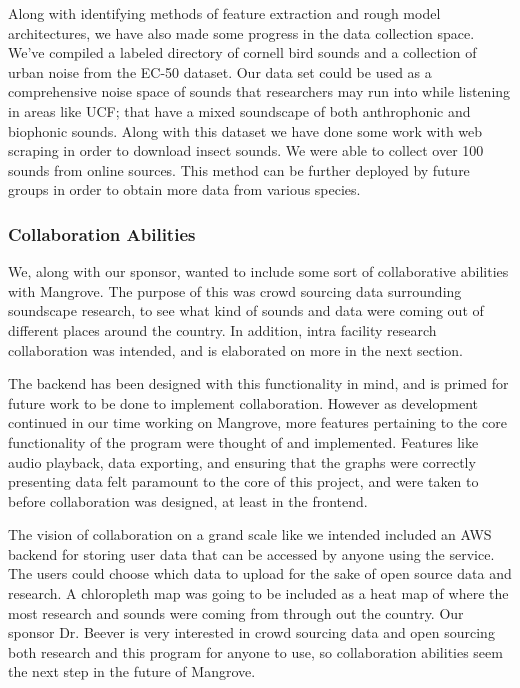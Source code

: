 Along with identifying methods of feature extraction and rough model architectures, we have also made some progress in the data collection space. We've compiled a labeled directory of cornell bird sounds and a collection of urban noise from the EC-50 dataset.\cite{soundData} Our data set could be used as a comprehensive noise space of sounds that researchers may run into while listening in areas like UCF; that have a mixed soundscape of both anthrophonic and biophonic sounds. Along with this dataset we have done some work with web scraping in order to download insect sounds. We were able to collect over 100 sounds from online sources.\cite{ot} This method can be further deployed by future groups in order to obtain more data from various species.

\subsubsection{Collaboration Abilities}
We, along with our sponsor, wanted to include some sort of collaborative abilities with Mangrove. The purpose of this was crowd sourcing data surrounding soundscape research, to see what kind of sounds and data were coming out of different places around the country. In addition, intra facility research collaboration was intended, and is elaborated on more in the next section.\par
The backend has been designed with this functionality in mind, and is primed for future work to be done to implement collaboration. However as development continued in our time working on Mangrove, more features pertaining to the core functionality of the program were thought of and implemented. Features like audio playback, data exporting, and ensuring that the graphs were correctly presenting data felt paramount to the core of this project, and were taken to before collaboration was designed, at least in the frontend.\par
The vision of collaboration on a grand scale like we intended included an AWS backend for storing user data that can be accessed by anyone using the service. The users could choose which data to upload for the sake of open source data and research. A chloropleth map was going to be included as a heat map of where the most research and sounds were coming from through out the country. Our sponsor Dr. Beever is very interested in crowd sourcing data and open sourcing both research and this program for anyone to use, so collaboration abilities seem the next step in the future of Mangrove.\\

